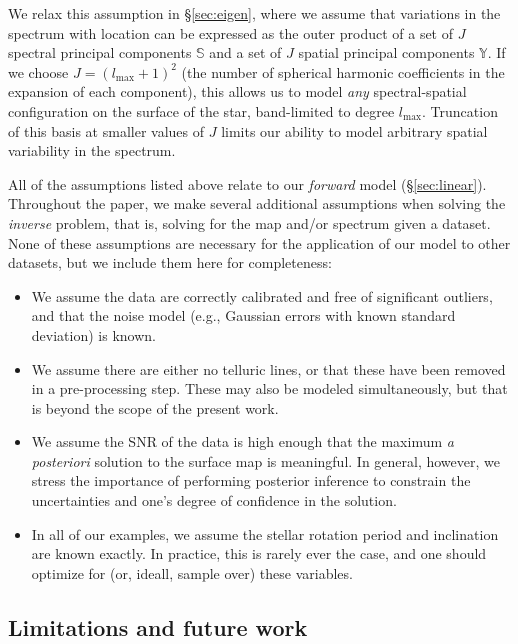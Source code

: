 \documentclass[modern]{aastex631}
\begin{document}
\begin{itemize}
    We relax this assumption in \S\ref{sec:eigen}, where we assume that variations in the spectrum with location can be expressed as the outer product of a set of $J$ spectral principal components $\boldsymbol{\mathbb{S}}$ and a set of $J$ spatial principal components $\boldsymbol{\mathbb{Y}}$.
    If we choose $J = (l_\mathrm{max} + 1)^2$ (the number of spherical harmonic coefficients in the expansion of each component), this allows us to model \emph{any} spectral-spatial configuration on the surface of the star, band-limited to degree $l_\mathrm{max}$.
    Truncation of this basis at smaller values of $J$ limits our ability to model arbitrary spatial variability in the spectrum.
\end{itemize}

All of the assumptions listed above relate to our \emph{forward} model (\S\ref{sec:linear}).
Throughout the paper, we make several additional assumptions when solving the \emph{inverse} problem, that is, solving for the map and/or spectrum given a dataset.
None of these assumptions are necessary for the application of our model to other datasets, but we include them here for completeness:

\begin{itemize}
    \item We assume the data are correctly calibrated and free of significant outliers, and that the noise model (e.g., Gaussian errors with known standard deviation) is known.
    \item We assume there are either no telluric lines, or that these have been removed in a pre-processing step.
    These may also be modeled simultaneously, but that is beyond the scope of the present work.
    \item We assume the SNR of the data is high enough that the maximum \emph{a posteriori} solution to the surface map is meaningful.
    In general, however, we stress the importance of performing posterior inference to constrain the uncertainties and one's degree of confidence in the solution.
    \item In all of our examples, we assume the stellar rotation period and inclination are known exactly.
    In practice, this is rarely ever the case, and one should optimize for (or, ideall, sample over) these variables.
\end{itemize}

\subsection{Limitations and future work}
\label{sec:discussion:caveats}
\end{document}
